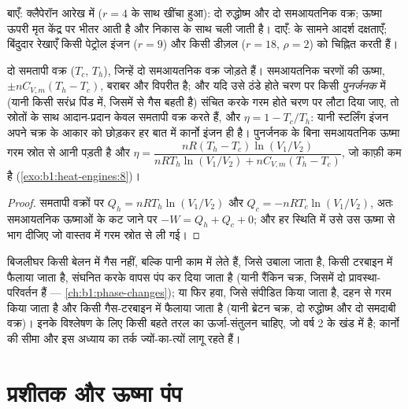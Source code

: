 \begin{omfigure}
{\small बाएँ: क्लैपेरॉन आरेख में  ($r = 4$ के साथ खींचा हुआ): दो
रुद्धोष्म और दो समआयतनिक वक्र; ऊष्मा ऊपरी मृत केंद्र पर भीतर आती है और
निकास के साथ चली जाती है। दाएँ:  के सामने आदर्श दक्षताएँ;
बिंदुदार रेखाएँ किसी पेट्रोल इंजन ($r = 9$) और किसी डीज़ल ($r = 18$,
$\rho = 2$) को चिह्नित करती हैं।}
\end{omfigure}

\begin{proposition}[स्टर्लिंग चक्र और पुनर्जनक]\label{prop:b1:heat-engines:stirling}
दो समतापी वक्र ($T_c$, $T_h$), जिन्हें दो समआयतनिक वक्र जोड़ते हैं।
समआयतनिक चरणों की ऊष्मा, $\pm nC_{V,m}(T_h - T_c)$, बराबर और विपरीत है; और
यदि उसे ठंडे होते चरण पर किसी \emph{पुनर्जनक} में (यानी किसी सरंध्र पिंड
में, जिसमें से गैस बहती है) संचित करके गरम होते चरण पर लौटा दिया जाए, तो
स्रोतों के साथ आदान-प्रदान केवल समतापी वक्र करते हैं, और
$\eta = 1 - T_c/T_h$: यानी स्टर्लिंग इंजन अपने चक्र के आकार को छोड़कर हर
बात में कार्नो इंजन ही है। पुनर्जनक के बिना समआयतनिक ऊष्मा गरम स्रोत से आनी
पड़ती है और
$\eta = \dfrac{nR(T_h - T_c)\ln(V_1/V_2)}{nRT_h\ln(V_1/V_2) + nC_{V,m}(T_h - T_c)}$,
जो काफ़ी कम है (\cref{exo:b1:heat-engines:8})।
\end{proposition}

\begin{proof}
समतापी वक्रों पर $Q_h = nRT_h\ln(V_1/V_2)$ और $Q_c = -nRT_c\ln(V_1/V_2)$, अतः
समआयतनिक ऊष्माओं के कट जाने पर $-W = Q_h + Q_c + 0$; और हर स्थिति में उसे
उस ऊष्मा से भाग दीजिए जो वास्तव में गरम स्रोत से ली गई।
\end{proof}

\begin{remark}[भाप और गैस टरबाइन]\label{rem:b1:heat-engines:turbines}
बिजलीघर किसी बेलन में गैस नहीं, बल्कि पानी काम में लेते हैं, जिसे उबाला
जाता है, किसी टरबाइन में फैलाया जाता है, संघनित करके वापस पंप कर दिया जाता
है (यानी रैंकिन चक्र, जिसमें दो प्रावस्था-परिवर्तन हैं ---
\cref{ch:b1:phase-changes}); या फिर हवा, जिसे संपीडित किया जाता है, दहन से
गरम किया जाता है और किसी गैस-टरबाइन में फैलाया जाता है (यानी ब्रेटन चक्र,
दो रुद्धोष्म और दो समदाबी वक्र)। इनके विश्लेषण के लिए किसी बहते तरल का
ऊर्जा-संतुलन चाहिए, जो वर्ष 2 के खंड में है; कार्नो की सीमा और इस अध्याय
का तर्क ज्यों-का-त्यों लागू रहते हैं।
\end{remark}

\section{प्रशीतक और ऊष्मा पंप}

